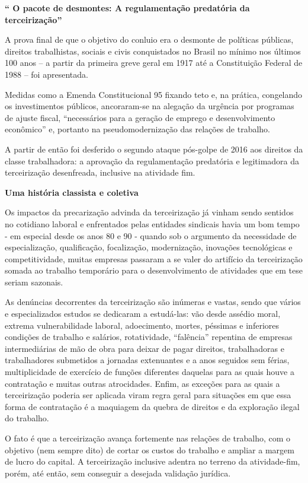\textbf{`` O pacote de desmontes: A regulamentação predatória da
terceirização''}

A prova final de que o objetivo do conluio era o desmonte de políticas
públicas, direitos trabalhistas, sociais e civis conquistados no Brasil
no mínimo nos últimos 100 anos -- a partir da primeira greve geral em
1917 até a Constituição Federal de 1988 -- foi apresentada.

Medidas como a Emenda Constitucional 95 fixando teto e, na prática,
congelando os investimentos públicos, ancoraram-se na alegação da
urgência por programas de ajuste fiscal, ``necessários para a geração de
emprego e desenvolvimento econômico'' e, portanto na pseudomodernização
das relações de trabalho.

A partir de então foi desferido o segundo ataque pós-golpe de 2016 aos
direitos da classe trabalhadora: a aprovação da regulamentação
predatória e legitimadora da terceirização desenfreada, inclusive na
atividade fim.

\textbf{Uma história classista e coletiva}

Os impactos da precarização advinda da terceirização já vinham sendo
sentidos no cotidiano laboral e enfrentados pelas entidades sindicais
havia um bom tempo - em especial desde os anos 80 e 90 - quando sob o
argumento da necessidade de especialização, qualificação, focalização,
modernização, inovações tecnológicas e competitividade, muitas empresas
passaram a se valer do artifício da terceirização somada ao trabalho
temporário para o desenvolvimento de atividades que em tese seriam
sazonais.

As denúncias decorrentes da terceirização são inúmeras e vastas, sendo
que vários e especializados estudos se dedicaram a estudá-las: vão desde
assédio moral, extrema vulnerabilidade laboral, adoecimento, mortes,
péssimas e inferiores condições de trabalho e salários, rotatividade,
``falência'' repentina de empresas intermediárias de mão de obra para
deixar de pagar direitos, trabalhadoras e trabalhadores submetidos a
jornadas extenuantes e a anos seguidos sem férias, multiplicidade de
exercício de funções diferentes daquelas para as quais houve a
contratação e muitas outras atrocidades. Enfim, as exceções para as
quais a terceirização poderia ser aplicada viram regra geral para
situações em que essa forma de contratação é a maquiagem da quebra de
direitos e da exploração ilegal do trabalho.

O fato é que a terceirização avança fortemente nas relações de trabalho,
com o objetivo (nem sempre dito) de cortar os custos do trabalho e
ampliar a margem de lucro do capital. A terceirização inclusive adentra
no terreno da atividade-fim, porém, até então, sem conseguir a desejada
validação jurídica.

